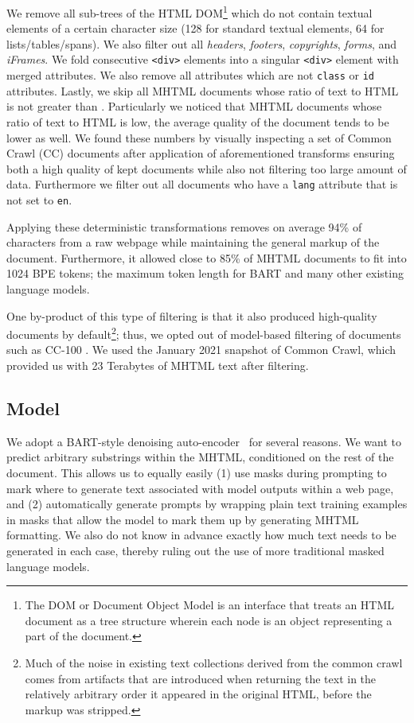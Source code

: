 \documentclass[11pt,a4paper]{article}
\begin{document}
We remove all sub-trees of the HTML DOM\footnote{The DOM or Document Object Model is an interface that treats an HTML document as a tree structure wherein each node is an object representing a part of the document.} which do not contain textual elements of a certain character size (128 for standard textual elements, 64 for lists/tables/spans). 
We also filter out all \textit{headers}, \textit{footers}, \textit{copyrights}, \textit{forms}, and \textit{iFrames}. We fold consecutive \verb+<div>+ elements into a singular \verb+<div>+ element with merged attributes. We also remove all attributes which are not \verb+class+ or \verb+id+ attributes. Lastly, we skip all MHTML documents whose ratio of text to HTML is not greater than . Particularly we noticed that MHTML documents whose ratio of text to HTML is low, the average quality of the document tends to be lower as well. We found these numbers by visually inspecting a set of Common Crawl (CC) documents after application of aforementioned transforms ensuring both a high quality of kept documents while also not filtering too large amount of data. Furthermore we filter out all documents who have a \verb+lang+ attribute that is not set to \verb+en+.

Applying these deterministic transformations removes on average 94\% of characters from a raw webpage while maintaining the general markup of the document. Furthermore, it allowed close to 85\% of MHTML documents to fit into 1024 BPE tokens; the maximum token length for BART and many other existing language models.

One by-product of this type of filtering is that it also produced high-quality documents by default\footnote{Much of the noise in existing text collections derived from the common crawl comes from artifacts that are introduced when returning the text in the relatively arbitrary order it appeared in the original HTML, before the markup was stripped.}; thus, we opted out of model-based filtering of documents such as CC-100 \citep{XLMR}. We used the January 2021 snapshot of Common Crawl, which provided us with 23 Terabytes of MHTML text after filtering.

\subsection{Model}
\label{sec:model}

We adopt a BART-style denoising auto-encoder~\citep{BART} for several reasons. We want to predict arbitrary substrings within the MHTML, conditioned on the rest of the document. This allows us to equally easily (1) use masks during prompting to mark where to generate text associated with model outputs within a web page, and (2) automatically generate prompts by wrapping plain text training examples in masks that allow the model to mark them up by generating MHTML formatting.  We also do not know in advance exactly how much text needs to be generated in each case, thereby ruling out the use of more traditional masked language models. 
\end{document}

